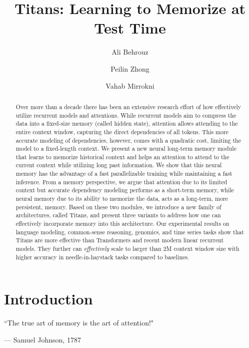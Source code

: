 \documentclass{article}
\title{Titans: Learning to Memorize at Test Time}
\author[$^\dagger$]{Ali Behrouz}
\author[$^\dagger$]{Peilin Zhong}
\author[$^\dagger$]{Vahab Mirrokni}
\affil[$^\dagger$]{Google Research}
\affil[ ]{{\small \texttt{\{alibehrouz, peilinz, mirrokni\}@google.com}}}
\date{}
\begin{document}
\maketitle

\begin{abstract}
  Over more than a decade there has been an extensive research effort of how effectively utilize recurrent models and attentions. While recurrent models aim to compress the data into a fixed-size memory (called hidden state), attention allows attending to the entire context window, capturing the direct dependencies of all tokens. This more accurate modeling of dependencies, however, comes with a quadratic cost, limiting the model to a fixed-length context. We present a new neural long-term memory module that learns to memorize historical context and helps an attention to attend to the current context while utilizing long past information. We show that this neural memory has the advantage of a fast parallelizable training while maintaining a fast inference. From a memory perspective, we argue that attention due to its limited context but accurate dependency modeling performs as a short-term memory, while neural memory due to its ability to memorize the data, acts as a long-term, more persistent, memory. Based on these two modules, we introduce a new family of architectures, called Titans, and present three variants to address how one can effectively incorporate memory into this architecture. Our experimental results on language modeling, common-sense reasoning, genomics, and time series tasks show that Titans are more effective than Transformers and recent modern linear recurrent models. They further can \emph{effectively} scale to larger than 2M context window size with higher accuracy in needle-in-haystack tasks compared to baselines.
\end{abstract}

\vspace{5ex}
\section{Introduction}\label{sec:intro}
\vspace{-8ex}
\epigraph{``The true art of memory is the art of attention!"}{--- \textup{Samuel Johnson}, 1787}
\vspace{1ex}
\end{document}
